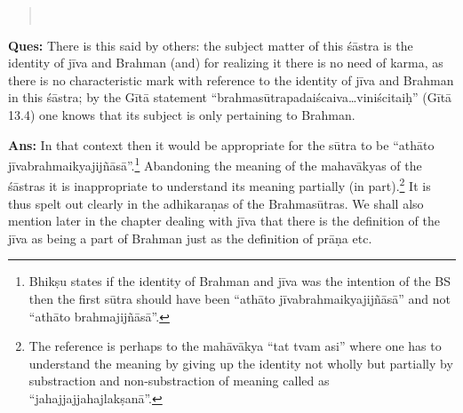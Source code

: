 \begin{verse}
\\
\end{verse}


\textbf{Ques:} There is this said by others: the subject matter of this śāstra is the identity of jīva and Brahman (and) for realizing it there is no need of karma, as there is no characteristic mark with reference to the identity of jīva and Brahman in this śāstra; by the Gītā statement “brahmasūtrapadaiścaiva…viniścitaiḥ” (Gītā 13.4)  one knows that its subject is only pertaining to Brahman.

\textbf{Ans:} In that context then it would be appropriate for the sūtra to be “athāto jīvabrahmaikyajijñāsā”.\footnote{Bhikṣu states if the identity of Brahman and jīva was the intention of the BS then the first sūtra should have been “athāto jīvabrahmaikyajijñāsā” and not “athāto brahmajijñāsā”.} Abandoning the meaning of the mahavākyas of the śāstras it is inappropriate to understand its meaning partially (in part).\footnote{The reference is perhaps to the mahāvākya “tat tvam asi” where one has to understand the meaning by giving up the identity not wholly but partially by substraction and non-substraction of meaning called as “jahajjajjahajlakṣanā”.} It is thus spelt out clearly in the adhikaraṇas of the Brahmasūtras. We shall also mention later in the chapter dealing with jīva that there is the definition of the jīva as being a part of Brahman just as the definition of prāṇa etc.

